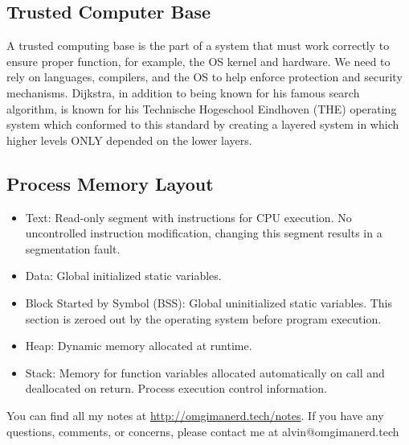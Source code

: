 \documentclass{math}
\begin{document}
\subsection*{Trusted Computer Base}
A trusted computing base is the part of a system that must work correctly to
ensure proper function, for example, the OS kernel and hardware. We need to
rely on languages, compilers, and the OS to help enforce protection and security
mechanisms. Dijkstra, in addition to being known for his famous search
algorithm, is known for his Technische Hogeschool Eindhoven (THE) operating
system which conformed to this standard by creating a layered system in which
higher levels ONLY depended on the lower layers.

\subsection*{Process Memory Layout}
\begin{itemize}
  \item Text: Read-only segment with instructions for CPU execution. No
  uncontrolled instruction modification, changing this segment results in a
  segmentation fault.
  \item Data: Global initialized static variables.
  \item Block Started by Symbol (BSS): Global uninitialized static variables.
  This section is zeroed out by the operating system before program execution.
  \item Heap: Dynamic memory allocated at runtime.
  \item Stack: Memory for function variables allocated automatically on call
  and deallocated on return. Process execution control information.
\end{itemize}

\begin{center}
  You can find all my notes at \url{http://omgimanerd.tech/notes}. If you have
  any questions, comments, or concerns, please contact me at
  alvin@omgimanerd.tech
\end{center}
\end{document}

